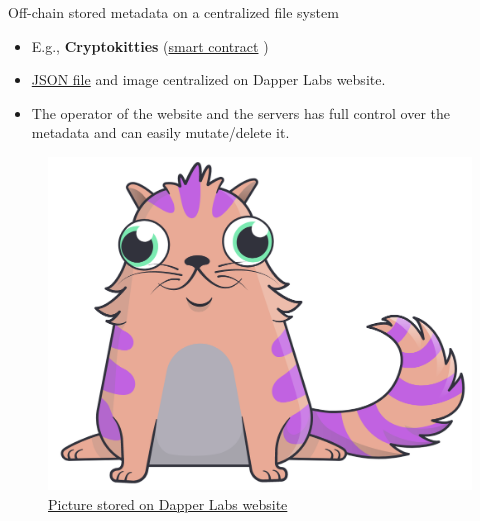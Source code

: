 \documentclass[]{beamer}
\begin{document}
\begin{frame}{Off-chain stored metadata on a centralized file system}

\begin{itemize}
	\item E.g., \textbf{Cryptokitties} (\href{https://etherscan.io/address/0x06012c8cf97bead5deae237070f9587f8e7a266d}{\link smart contract} )
	\item \href{https://api.cryptokitties.co/kitties/2252}{\link  JSON file} and image centralized on Dapper Labs website.
	\item The operator of the website and the servers has full control over the metadata and can easily mutate/delete it.
\end{itemize}
\vspace{1em}
\begin{figure}
	\centering
	\includegraphics[scale=0.2]{../assets/images/cryptokitty.png}
	\caption*{\link \href{https://img.cn.cryptokitties.co/0x06012c8cf97bead5deae237070f9587f8e7a266d/2252.svg} {Picture stored on Dapper Labs website}}
\end{figure}
\end{frame}
\end{document}
